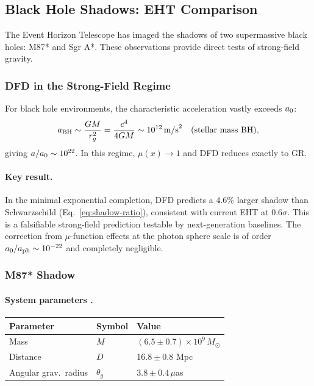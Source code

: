 \subsection{Black Hole Shadows: EHT Comparison}\label{sec:strong-eht}

The Event Horizon Telescope has imaged the shadows of two supermassive black holes: M87* and Sgr A*. These observations provide direct tests of strong-field gravity.

\subsubsection{DFD in the Strong-Field Regime}\label{sec:strong-dfd-regime}

For black hole environments, the characteristic acceleration vastly exceeds $a_0$:
\begin{equation}
a_{\rm BH} \sim \frac{GM}{r_g^2} = \frac{c^4}{4GM} \sim 10^{12}\,\text{m/s}^2 \quad \text{(stellar mass BH)},
\end{equation}
giving $a/a_0 \sim 10^{22}$. In this regime, $\mu(x) \to 1$ and DFD reduces exactly to GR.

\paragraph{Key result.}
In the minimal exponential completion, DFD predicts a 4.6\% larger shadow than Schwarzschild (Eq.~\ref{eq:shadow-ratio}), consistent with current EHT at $0.6\sigma$.  This is a falsifiable strong-field prediction testable by next-generation baselines.  The correction from $\mu$-function effects at the photon sphere scale is of order $a_0/a_{\rm ph} \sim 10^{-22}$ and completely negligible.

\subsubsection{M87* Shadow}\label{sec:strong-m87}

\paragraph{System parameters \cite{EHT_M87_2019}.}
\begin{center}
\renewcommand{\arraystretch}{1.1}
\begin{tabular}{lll}
\toprule
Parameter & Symbol & Value \\
\midrule
Mass & $M$ & $(6.5 \pm 0.7) \times 10^9\, M_\odot$ \\
Distance & $D$ & $16.8 \pm 0.8$ Mpc \\
Angular grav.\ radius & $\theta_g$ & $3.8 \pm 0.4\,\mu$as \\
\bottomrule
\end{tabular}
\end{center}

